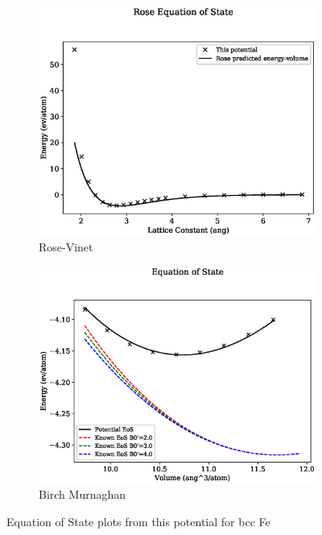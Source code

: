 \begin{figure}[htb]
\begin{subfigure}{.44\textwidth}
  \centering
  \includegraphics[width=.94\linewidth]{chapters/potentials_fe_pd_ru/feru_potential/eos/rose_plot_bp_0.eps}  
  \caption{Rose-Vinet}
  \label{fig:feru-febcc-rose}
\end{subfigure}
\begin{subfigure}{.44\textwidth}
  \centering
  \includegraphics[width=.94\linewidth]{chapters/potentials_fe_pd_ru/feru_potential/eos/equation_of_state_bp_0.eps}  
  \caption{Birch Murnaghan}
  \label{fig:feru-febcc-bmeos}
\end{subfigure}
\label{fig:fepd-febcc-equation-of-state}
\caption{Equation of State plots from this potential for \acrshort{bcc} Fe}
\end{figure}


